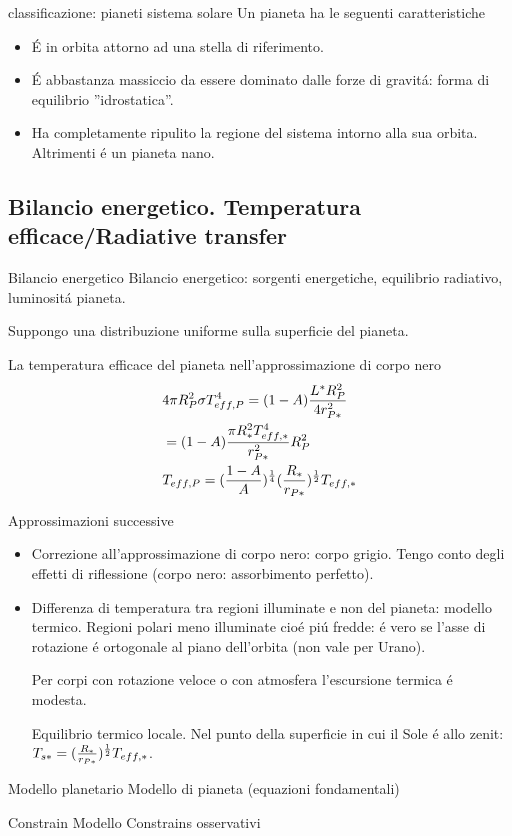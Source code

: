 \begin{wordonframe}{classificazione: pianeti sistema solare}
Un pianeta ha le seguenti caratteristiche
\begin{itemize}
    \item \'E in orbita attorno ad una stella di riferimento.
    \item \'E abbastanza massiccio da essere dominato dalle forze di gravit\'a: forma di equilibrio ''idrostatica''.
        \item Ha completamente ripulito la regione del sistema intorno alla sua orbita. Altrimenti \'e un pianeta nano.
\end{itemize}

\end{wordonframe}


\subsection{Bilancio energetico. Temperatura efficace/Radiative transfer}

\begin{frame}{Bilancio energetico}
Bilancio energetico: sorgenti energetiche, equilibrio radiativo, luminosit\'a pianeta.

Suppongo una distribuzione uniforme sulla superficie del pianeta.

La temperatura efficace del pianeta nell’approssimazione di corpo nero
\begin{align*}
&4\pi R_P^2\sigma T_{eff,P}^4=(1-A)\frac{L^*R_P^2}{4r_{P*}^2}\\
&=(1-A)\frac{\pi R_*^2T_{eff,*}^4}{r_{P*}^2}R_P^2\\
&T_{eff,P}=(\frac{1-A}{A})^{\frac{1}{4}}(\frac{R_*}{r_{P*}})^{\frac{1}{2}}T_{eff,*}
\end{align*}

Approssimazioni successive
\begin{itemize}
    \item Correzione all’approssimazione di corpo nero: corpo grigio. Tengo conto degli effetti di riflessione (corpo nero: assorbimento perfetto).
    \item Differenza di temperatura tra regioni illuminate e non del pianeta: modello termico. Regioni polari meno illuminate cio\'e pi\'u fredde: \'e vero se l’asse di rotazione \'e ortogonale al piano dell’orbita (non vale per Urano).
    
    Per corpi con rotazione veloce o con atmosfera l’escursione termica \'e modesta.
    
    Equilibrio termico locale. Nel punto della superficie in cui il Sole \'e allo zenit: $T_{s*}=(\frac{R_*}{r_{P*}})^{\frac{1}{2}}T_{eff,*}$.
\end{itemize}
\end{frame}

\begin{frame}{Modello planetario}
Modello di pianeta (equazioni fondamentali)
\end{frame}

\begin{frame}{Constrain Modello}
Constrains osservativi
\end{frame}
